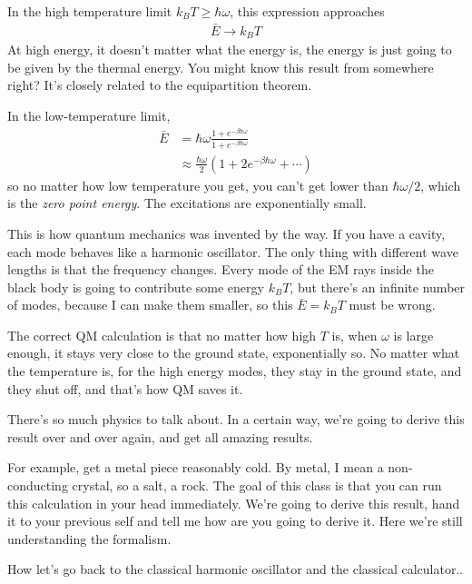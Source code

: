 In the high temperature limit $k_B T \ge \hbar\omega$,
this expression approaches
\begin{align}
    \bar{E} \to k_B T
\end{align}
At high energy,
it doesn't matter what the energy is,
the energy is just going to be given by the thermal energy.
You might know this result from somewhere right?
It's closely related to the equipartition theorem.

In the low-temperature limit,
\begin{align}
    \bar{E} &=
    \hbar\omega
    \frac{1 + e^{-\beta\hbar\omega}}{1 + e^{-\beta\hbar\omega}}\\
    &\approx
    \frac{\hbar\omega}{2}\left(
        1 + 2e^{-\beta\hbar\omega} + \cdots
    \right)
\end{align}
so no matter how low temperature you get,
you can't get lower than $\hbar\omega/2$,
which is the \emph{zero point energy}.
The excitations are exponentially small.

This is how quantum mechanics was invented by the way.
If you have a cavity,
each mode behaves like a harmonic oscillator.
The only thing with different wave lengths is that the frequency changes.
Every mode of the EM rays inside the black body is going to contribute some
energy $k_B T$,
but there's an infinite number of modes,
because I can make them smaller,
so this $\bar{E} = k_B T$ must be wrong.

The correct QM calculation is that no matter how high $T$ is,
when $\omega$ is large enough,
it stays very close to the ground state,
exponentially so.
No matter what the temperature is,
for the high energy modes,
they stay in the ground state,
and they shut off,
and that's how QM saves it.

There's so much physics to talk about.
In a certain way,
we're going to derive this result over and over again,
and get all amazing results.

For example,
get a metal piece reasonably cold.
By metal,
I mean a non-conducting crystal,
so a salt,
a rock.
The goal of this class is that you can run this calculation in your head
immediately.
We're going to derive this result,
hand it to your previous self and tell me how are you going to derive it.
Here we're still understanding the formalism.

How let's go back to the classical harmonic oscillator
and the classical calculator..

